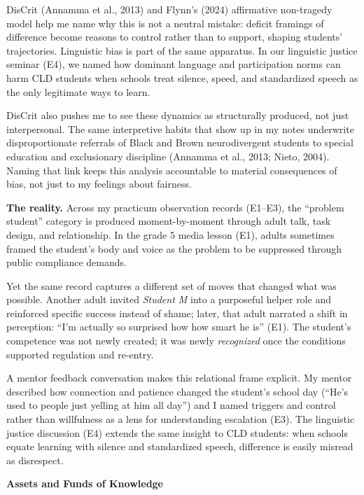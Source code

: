 \documentclass[12pt]{article}
\newcommand{\apaheading}[1]{\begin{center}\textbf{#1}\end{center}}
\newcommand{\EvidenceSet}[1]{\textsc{E#1}}
\begin{document}
DisCrit (Annamma et al., 2013) and Flynn's (2024) affirmative non-tragedy model help me name why this is not a neutral mistake: deficit framings of difference become reasons to control rather than to support, shaping students' trajectories. Linguistic bias is part of the same apparatus. In our linguistic justice seminar (\EvidenceSet{4}), we named how dominant language and participation norms can harm CLD students when schools treat silence, speed, and standardized speech as the only legitimate ways to learn.

DisCrit also pushes me to see these dynamics as structurally produced, not just interpersonal. The same interpretive habits that show up in my notes underwrite disproportionate referrals of Black and Brown neurodivergent students to special education and exclusionary discipline (Annamma et al., 2013; Nieto, 2004). Naming that link keeps this analysis accountable to material consequences of bias, not just to my feelings about fairness.

\textbf{The reality.} Across my practicum observation records (\EvidenceSet{1}--\EvidenceSet{3}), the ``problem student'' category is produced moment-by-moment through adult talk, task design, and relationship. In the grade 5 media lesson (\EvidenceSet{1}), adults sometimes framed the student's body and voice as the problem to be suppressed through public compliance demands.

Yet the same record captures a different set of moves that changed what was possible. Another adult invited \textit{Student M} into a purposeful helper role and reinforced specific success instead of shame; later, that adult narrated a shift in perception: ``I'm actually so surprised how how smart he is'' (\EvidenceSet{1}). The student's competence was not newly created; it was newly \textit{recognized} once the conditions supported regulation and re-entry.

A mentor feedback conversation makes this relational frame explicit. My mentor described how connection and patience changed the student's school day (``He's used to people just yelling at him all day'') and I named triggers and control rather than willfulness as a lens for understanding escalation (\EvidenceSet{3}). The linguistic justice discussion (\EvidenceSet{4}) extends the same insight to CLD students: when schools equate learning with silence and standardized speech, difference is easily misread as disrespect.

\apaheading{Assets and Funds of Knowledge}
\end{document}
